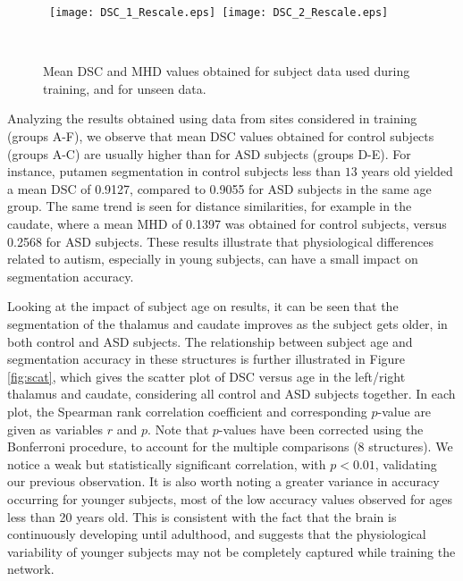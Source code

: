 \documentclass[twoside,fleqn,espcrc2]{elsarticle}
\begin{document}
\begin{figure}[h!]
     \begin{center}
     \mbox{
        \texttt{[image: DSC\_1\_Rescale.eps]}
        \texttt{[image: DSC\_2\_Rescale.eps]}
     }

     \vspace{1mm}

     \mbox{
        }
        \caption{Mean DSC and MHD values obtained for subject data used during training, and for unseen data.}
        \label{fig:dsc1}
\end{center}
\end{figure}

Analyzing the results obtained using data from sites considered in training (groups A-F), we observe that mean DSC values obtained for control subjects (groups A-C) are usually higher than for ASD subjects (groups D-E). For instance, putamen segmentation in control subjects less than $13$ years old yielded a mean DSC of 0.9127, compared to 0.9055 for ASD subjects in the same age group. The same trend is seen for distance similarities, for example in the caudate, where a mean MHD of 0.1397 was obtained for control subjects, versus 0.2568 for ASD subjects. These results illustrate that physiological differences related to autism, especially in young subjects, can have a small impact on segmentation accuracy.

Looking at the impact of subject age on results, it can be seen that the segmentation of the thalamus and caudate improves as the subject gets older, in both control and ASD subjects. The relationship between subject age and segmentation accuracy in these structures is further illustrated in Figure \ref{fig:scat}, which gives the scatter plot of DSC versus age in the left/right thalamus and caudate, considering all control and ASD subjects together. In each plot, the Spearman rank correlation coefficient and corresponding $p$-value are given as variables $r$ and $p$. Note that $p$-values have been corrected using the Bonferroni procedure, to account for the multiple comparisons (8 structures). We notice a weak but statistically significant correlation, with $p < 0.01$, validating our previous observation. It is also worth noting a greater variance in accuracy occurring for younger subjects, most of the low accuracy values observed for ages less than 20 years old. This is consistent with the fact that the brain is continuously developing until adulthood, and suggests that the physiological variability of younger subjects may not be completely captured while training the network.
\end{document}
